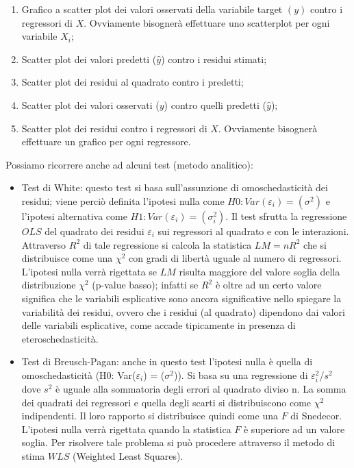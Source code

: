 \documentclass[a4page, 11pt]{article}
\begin{document}
\begin{enumerate}[noitemsep]
\item Grafico a scatter plot dei valori osservati della variabile target $(y)$ contro i regressori di $X$. Ovviamente bisognerà effettuare uno scatterplot per ogni variabile $X_i$;
\item Scatter plot dei valori predetti ($\hat{y}$) contro i residui stimati;
\item Scatter plot dei residui al quadrato contro i predetti;
\item Scatter plot dei valori osservati ($y$) contro quelli predetti ($\hat{y}$);
\item Scatter plot dei residui contro i regressori di $X$. Ovviamente bisognerà effettuare un grafico per ogni regressore.
\end{enumerate}
Possiamo ricorrere anche ad alcuni test (metodo analitico):
\begin{itemize}
\item Test di White: questo test si basa sull’assunzione di omoschedasticità dei residui; viene perciò definita l’ipotesi nulla come $H0: Var(\varepsilon_i) = (\sigma^2)$ e l’ipotesi alternativa come $H1: Var(\varepsilon_i ) = ( \sigma^2_i )$.
Il test sfrutta la regressione $OLS$ del quadrato dei residui $\varepsilon_i$ sui regressori al quadrato e con le interazioni.
Attraverso $R^{2}$ di tale regressione si calcola la statistica $LM=n R^{2}$ che si distribuisce come una $\chi^{2}$ con gradi di libertà uguale al numero di regressori. L’ipotesi nulla verrà rigettata se $LM$ risulta maggiore del valore soglia della distribuzione $\chi^{2}$ (p-value basso); %
infatti se $R^{2}$ è oltre ad un certo valore significa che le variabili esplicative sono ancora significative nello spiegare la variabilità dei residui, ovvero che i residui (al quadrato) dipendono dai valori delle variabili esplicative, come accade tipicamente in presenza di eteroschedasticità.

\item Test di Breusch-Pagan: anche in questo test l’ipotesi nulla è quella di omoschedasticità (H0: Var($\varepsilon_i$) = ($\sigma^2$)).
Si basa su una regressione di $\varepsilon^{2}_i$/$s^{2}$ dove $s^{2}$ è uguale alla sommatoria degli errori al quadrato diviso n. La somma dei quadrati dei regressori e quella degli scarti si distribuiscono come $\chi^{2}$ indipendenti. Il loro rapporto si distribuisce quindi come una $F$ di Snedecor. L’ipotesi nulla verrà rigettata quando la statistica $F$ è superiore ad un valore soglia.
Per risolvere tale problema si può procedere attraverso il metodo di stima $WLS$ (Weighted Least Squares).
\end{itemize}
\end{document}
